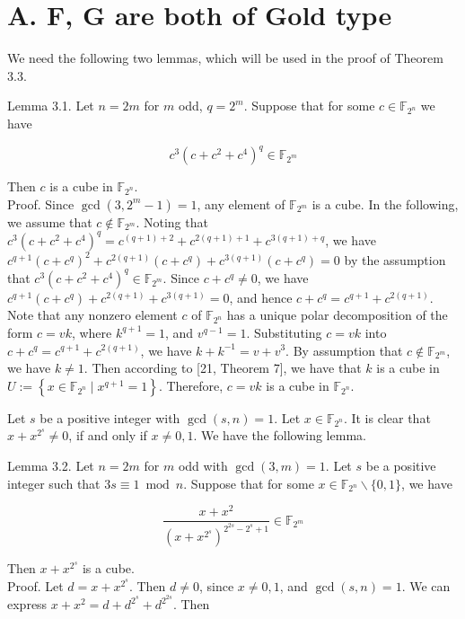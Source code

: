 \documentclass[10pt]{article}
\begin{document}
\section*{A. F, G are both of Gold type}
We need the following two lemmas, which will be used in the proof of Theorem 3.3.

Lemma 3.1. Let $n=2 m$ for $m$ odd, $q=2^{m}$. Suppose that for some $c \in \mathbb{F}_{2^{n}}$ we have

$$
c^{3}\left(c+c^{2}+c^{4}\right)^{q} \in \mathbb{F}_{2^{m}}
$$

Then $c$ is a cube in $\mathbb{F}_{2^{n}}$.\\
Proof. Since $\operatorname{gcd}\left(3,2^{m}-1\right)=1$, any element of $\mathbb{F}_{2^{m}}$ is a cube. In the following, we assume that $c \notin \mathbb{F}_{2^{m}}$. Noting that $c^{3}\left(c+c^{2}+c^{4}\right)^{q}=c^{(q+1)+2}+c^{2(q+1)+1}+c^{3(q+1)+q}$, we have $c^{q+1}\left(c+c^{q}\right)^{2}+c^{2(q+1)}\left(c+c^{q}\right)+c^{3(q+1)}\left(c+c^{q}\right)=0$ by the assumption that $c^{3}\left(c+c^{2}+c^{4}\right)^{q} \in \mathbb{F}_{2^{m}}$. Since $c+c^{q} \neq 0$, we have $c^{q+1}\left(c+c^{q}\right)+c^{2(q+1)}+c^{3(q+1)}=0$, and hence $c+c^{q}=c^{q+1}+c^{2(q+1)}$. Note that any nonzero element $c$ of $\mathbb{F}_{2^{n}}$ has a unique polar decomposition of the form $c=v k$, where $k^{q+1}=1$, and $v^{q-1}=1$. Substituting $c=v k$ into $c+c^{q}=c^{q+1}+c^{2(q+1)}$, we have $k+k^{-1}=v+v^{3}$. By assumption that $c \notin \mathbb{F}_{2^{m}}$, we have $k \neq 1$. Then according to [21, Theorem 7], we have that $k$ is a cube in $U:=\left\{x \in \mathbb{F}_{2^{n}} \mid x^{q+1}=1\right\}$. Therefore, $c=v k$ is a cube in $\mathbb{F}_{2^{n}}$.

Let $s$ be a positive integer with $\operatorname{gcd}(s, n)=1$. Let $x \in \mathbb{F}_{2^{n}}$. It is clear that $x+x^{2^{s}} \neq 0$, if and only if $x \neq 0,1$. We have the following lemma.

Lemma 3.2. Let $n=2 m$ for $m$ odd with $\operatorname{gcd}(3, m)=1$. Let $s$ be a positive integer such that $3 s \equiv 1 \bmod n$. Suppose that for some $x \in \mathbb{F}_{2^{n}} \backslash\{0,1\}$, we have

$$
\frac{x+x^{2}}{\left(x+x^{2^{s}}\right)^{2^{2 s}-2^{s}+1}} \in \mathbb{F}_{2^{m}}
$$

Then $x+x^{2^{s}}$ is a cube.\\
Proof. Let $d=x+x^{2^{s}}$. Then $d \neq 0$, since $x \neq 0,1$, and $\operatorname{gcd}(s, n)=1$. We can express $x+x^{2}=d+d^{2^{s}}+d^{2^{2 s}}$. Then
\end{document}
